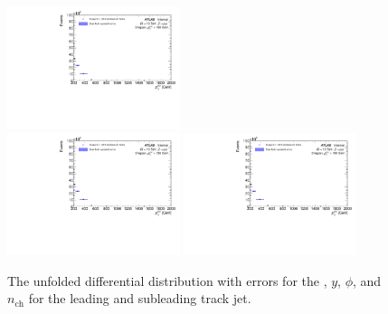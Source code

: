 \begin{figure}[h!]
  \includegraphics[page=592,width=0.45\textwidth]{figures/unfoldErrPlots.pdf} \\
  \includegraphics[page=752,width=0.45\textwidth]{figures/unfoldErrPlots.pdf}
  \includegraphics[page=784,width=0.45\textwidth]{figures/unfoldErrPlots.pdf}
  \caption{The unfolded differential distribution with errors for the \pt, $y$, $\phi$, and $n_{\text{ch}}$ for the leading and subleading track jet.}
  \label{fig:unfoldErr2}
\end{figure}

